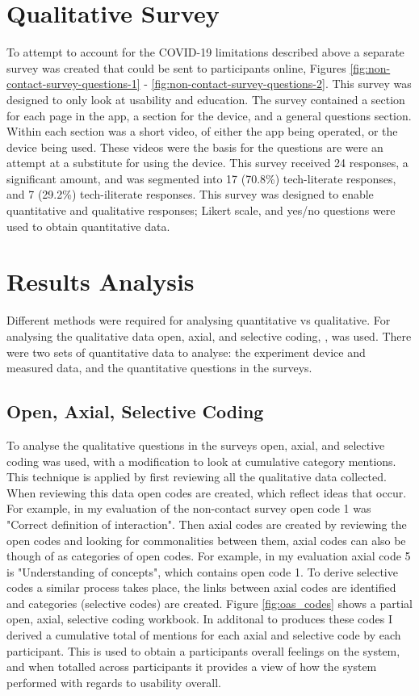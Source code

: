 \documentclass{l4proj}
\begin{document}
\section{Qualitative Survey}

To attempt to account for the COVID-19 limitations described above a separate survey was created that could be sent to participants online, Figures \ref{fig:non-contact-survey-questions-1} - \ref{fig:non-contact-survey-questions-2}. This survey was designed to only look at usability and education. The survey contained a section for each page in the app, a section for the device, and a general questions section. Within each section was a short video, of either the app being operated, or the device being used. These videos were the basis for the questions are were an attempt at a substitute for using the device. This survey received 24 responses, a significant amount, and was segmented into 17 (70.8\%) tech-literate responses, and 7 (29.2\%) tech-iliterate responses. This survey was designed to enable quantitative and qualitative responses; Likert scale, and yes/no questions were used to obtain quantitative data.

\section{Results Analysis}

Different methods were required for analysing quantitative vs qualitative. For analysing the qualitative data open, axial, and selective coding, \citep{williams_artofcoding_2019}, was used. There were two sets of quantitative data to analyse: the experiment device and measured data, and the quantitative questions in the surveys.

\subsection{Open, Axial, Selective Coding}

To analyse the qualitative questions in the surveys open, axial, and selective coding was used, with a modification to look at cumulative category mentions. This technique is applied by first reviewing all the qualitative data collected. When reviewing this data open codes are created, which reflect ideas that occur. For example, in my evaluation of the non-contact survey open code 1 was "Correct definition of interaction". Then axial codes are created by reviewing the open codes and looking for commonalities between them, axial codes can also be though of as categories of open codes. For example, in my evaluation axial code 5 is "Understanding of concepts", which contains open code 1. To derive selective codes a similar process takes place, the links between axial codes are identified and categories (selective codes) are created. Figure \ref{fig:oas_codes} shows a partial open, axial, selective coding workbook. In additonal to produces these codes I derived a cumulative total of mentions for each axial and selective code by each participant. This is used to obtain a participants overall feelings on the system, and when totalled across participants it provides a view of how the system performed with regards to usability overall.
\end{document}
